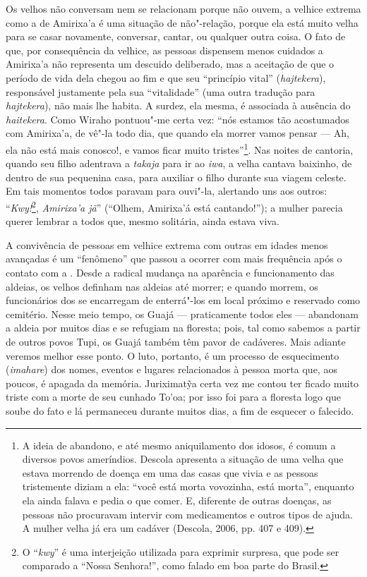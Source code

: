 Os velhos não conversam nem se relacionam porque não ouvem, a velhice
extrema como a de Amirixa'a é uma situação de não"-relação, porque ela
está muito velha para se casar novamente, conversar, cantar, ou qualquer
outra coisa. O fato de que, por consequência da velhice, as pessoas
dispensem menos cuidados a Amirixa'a não representa um descuido
deliberado, mas a aceitação de que o período de vida dela chegou ao fim
e que seu ``princípio vital'' (\emph{hajtekera}), responsável justamente
pela sua ``vitalidade'' (uma outra tradução para \emph{hajtekera}), não
mais lhe habita. A surdez, ela mesma, é associada à ausência do
\emph{haitekera}. Como Wiraho pontuou"-me certa vez: ``nós estamos tão
acostumados com Amirixa'a, de vê"-la todo dia, que quando ela morrer
vamos pensar --- Ah, ela não está mais conosco!, e vamos ficar muito
tristes''\footnote{A ideia de abandono, e até mesmo aniquilamento dos
  idosos, é comum a diversos povos ameríndios. Descola apresenta a
  situação de uma velha que estava morrendo de doença em uma das casas
  que vivia e as pessoas tristemente diziam a ela: ``você está morta
      vovozinha, está morta'', enquanto ela ainda falava e pedia o que comer.
  E, diferente de outras doenças, as pessoas não procuravam intervir com
  medicamentos e outros tipos de ajuda. A mulher velha já era um cadáver
  (Descola, 2006, pp. 407 e 409).}. Nas noites de cantoria, quando seu filho
adentrava a \emph{takaja} para ir ao \emph{iwa}, a velha cantava
baixinho, de dentro de sua pequenina casa, para auxiliar o filho durante
sua viagem celeste. Em tais momentos todos paravam para ouvi"-la,
alertando uns aos outros: ``\emph{Kwy!}\footnote{O ``\emph{kwy}'' é uma
  interjeição utilizada para exprimir surpresa, que pode ser comparado a
  ``Nossa Senhora!'', como falado em boa parte do Brasil.},
\emph{Amirixa'a jã}'' (``Olhem, Amirixa'á está cantando!''); a mulher
parecia querer lembrar a todos que, mesmo solitária, ainda estava viva.

A convivência de pessoas em velhice extrema com outras em idades menos
avançadas é um ``fenômeno'' que passou a ocorrer com mais frequência após
o contato com a . Desde a radical mudança na aparência e
funcionamento das aldeias, os velhos definham nas aldeias até morrer; e
quando morrem, os funcionários dos  se encarregam de enterrá"-los em
local próximo e reservado como cemitério. Nesse meio tempo, os Guajá ---
praticamente todos eles --- abandonam a aldeia por muitos dias e se
refugiam na floresta; pois, tal como sabemos a partir de outros povos
Tupi, os Guajá também têm pavor de cadáveres. Mais adiante veremos
melhor esse ponto. O luto, portanto, é um processo de esquecimento
(\emph{imahare}) dos nomes, eventos e lugares relacionados à pessoa
morta que, aos poucos, é apagada da memória. Juriximatỹa certa vez me
contou ter ficado muito triste com a morte de seu cunhado To'oa; por
isso foi para a floresta logo que soube do fato e lá permaneceu durante
muitos dias, a fim de esquecer o falecido.

